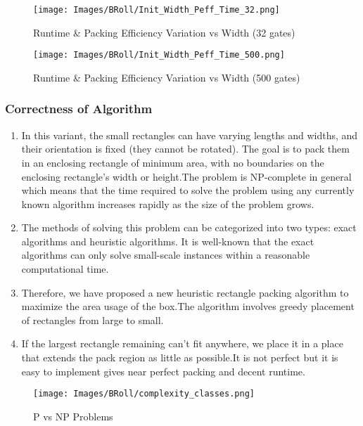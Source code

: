 \documentclass[12pt, a4paper,openany]{article}
\begin{document}
\newpage
\begin{figure}[ht]
    \centering
    \begin{minipage}{1.0\textwidth}
          \centering
          \texttt{[image: Images/BRoll/Init\_Width\_Peff\_Time\_32.png]}
          \label{fig:analysis-1}
          \caption{Runtime \& Packing Efficiency Variation vs Width (32 gates) }
          \centering
          \texttt{[image: Images/BRoll/Init\_Width\_Peff\_Time\_500.png]}
          \label{fig:analysis-2}
          \caption{Runtime \& Packing Efficiency Variation vs Width (500 gates) }
          
               
    \end{minipage}
\end{figure}


\subsubsection{Correctness of Algorithm}
\begin{enumerate}
    \item In this variant, the small rectangles can have varying lengths and widths, and their orientation is fixed (they cannot be rotated). The goal is to pack them in an enclosing rectangle of minimum area, with no boundaries on the enclosing rectangle's width or height.The problem is NP-complete in general which means that the time required to solve the problem using any currently known algorithm increases rapidly as the size of the problem grows.
    \item The methods of solving this problem can be categorized into two types: exact algorithms and heuristic algorithms. It is well-known that the exact algorithms can only solve small-scale instances within a reasonable computational time. 
    \item Therefore, we have proposed a new heuristic rectangle packing algorithm to maximize the area usage of the box.The algorithm involves greedy placement of rectangles from large to small.
    \item If the largest rectangle remaining can't fit anywhere, we place it in a place that extends the pack region as little as possible.It is not perfect but it is easy to implement gives near perfect packing and decent runtime. 
\end{enumerate}

\begin{figure}[ht]
    \centering
    \begin{minipage}{.5\textwidth}
          \centering
          \texttt{[image: Images/BRoll/complexity\_classes.png]}
          \label{fig:4bit-res1_sb}
          \caption{P vs NP Problems }
      
          
      \end{minipage}
    \end{figure}
\end{document}
